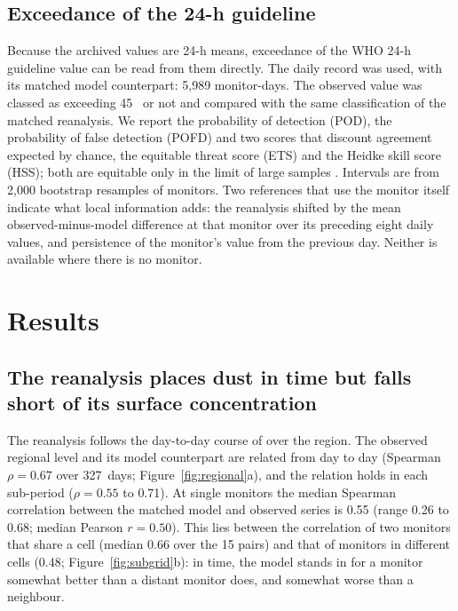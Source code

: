 \subsection{Exceedance of the 24-h guideline}

Because the archived values are 24-h means, exceedance of the WHO 24-h guideline value can be
read from them directly. The daily record was used, with its matched model counterpart: 5,989
monitor-days. The observed value was classed as exceeding 45~\ugm{} or not and compared with the
same classification of the matched reanalysis. We report the probability of detection (POD), the
probability of false detection (POFD) and two scores that discount agreement expected by chance,
the equitable threat score (ETS) and the Heidke skill score (HSS); both are equitable only in
the limit of large samples \citep{hogan2010}. Intervals are from 2,000
bootstrap resamples of monitors. Two references that use the monitor itself indicate what local
information adds: the reanalysis shifted by the mean observed-minus-model difference at that
monitor over its preceding eight daily values, and persistence of the monitor's value from the
previous day. Neither is available where there is no monitor.

\section{Results}

\subsection{The reanalysis places dust in time but falls short of its surface concentration}
\label{sec:res-dust}

The reanalysis follows the day-to-day course of \pmten{} over the region. The observed regional
level and its model counterpart are related from day to day (Spearman $\rho=0.67$ over 327~days;
Figure~\ref{fig:regional}a), and the relation holds in each sub-period ($\rho=0.55$ to 0.71). At
single monitors the median Spearman correlation between the matched model and observed series is
0.55 (range 0.26 to 0.68; median Pearson $r=0.50$). This lies between the correlation of two
monitors that share a cell (median 0.66 over the 15 pairs) and that of monitors in different cells
(0.48; Figure~\ref{fig:subgrid}b): in time, the model stands in for a monitor somewhat better than
a distant monitor does, and somewhat worse than a neighbour.

